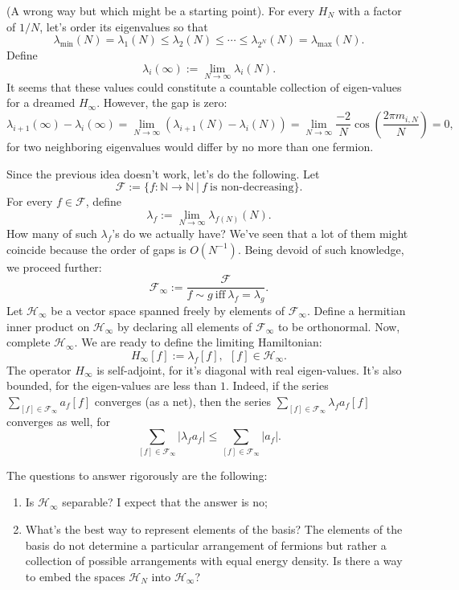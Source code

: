 \begin{idea}
(A wrong way but which might be a starting point). For every $H_N$ with a factor of $1/N$, let's order its eigenvalues so that
\[
\lambda_{\min}(N) = \lambda_1(N) \leq \lambda_2(N) \leq \cdots \leq \lambda_{2^N}(N) = \lambda_{\max}(N).
\]
Define
\[
\lambda_{i}(\infty) := \lim_{N \rightarrow \infty}\lambda_i(N).
\]
It seems that these values could constitute a countable collection of eigen-values for a dreamed $H_{\infty}$. However, the gap is zero:
\[
\lambda_{i+1}(\infty) - \lambda_{i}(\infty) = \lim_{N \rightarrow \infty}(\lambda_{i+1}(N) - \lambda_{i}(N)) = \lim_{N\rightarrow \infty} \frac{-2}{N}\cos(\frac{2\pi m_{i,N}}{N}) = 0,
\]
for two neighboring eigenvalues would differ by no more than one fermion.
\end{idea}
\begin{idea}
Since the previous idea doesn't work, let's do the following. Let
\[
\mathcal F := \{f : \mathbb N \rightarrow \mathbb N \ | \ f \ \text{is non-decreasing} \}.
\]
For every $f \in \mathcal F$, define
\[
\lambda_f := \lim_{N \rightarrow \infty} \lambda_{f(N)}(N).
\]
How many of such $\lambda_f$'s do we actually have? We've seen that a lot of them might coincide because the order of gaps is $O(N^{-1})$. Being devoid of such knowledge, we proceed further:
\[
\mathcal F_{\infty} := \frac{\mathcal F}{f \sim g \ \text{iff} \ \lambda_f = \lambda_g}.
\]
Let $\mathcal H_{\infty}$ be a vector space spanned freely by elements of $\mathcal F_{\infty}$. Define a hermitian inner product on $\mathcal H_{\infty}$ by declaring all elements of $\mathcal F_{\infty}$ to be orthonormal. Now, complete $\mathcal H_{\infty}$. We are ready to define the limiting Hamiltonian:
\[
H_{\infty} [f] := \lambda_f [f], \ \ [f] \in \mathcal H_{\infty}.
\]
The operator $H_{\infty}$ is self-adjoint, for it's diagonal with real eigen-values. It's also bounded, for the eigen-values are less than $1$. Indeed, if the series $\sum_{[f] \in \mathcal F_{\infty}} a_{f} [f]$ converges (as a net), then the series $\sum_{[f] \in \mathcal F_{\infty}} \lambda_fa_{f} [f]$ converges as well, for 
\[
\sum_{[f] \in \mathcal F_{\infty}} |\lambda_fa_{f}| \leq \sum_{[f] \in \mathcal F_{\infty}} |a_{f}|.
\]

The questions to answer rigorously are the following:
\begin{enumerate}
\item Is $\mathcal{H}_{\infty}$ separable? I expect that the answer is no;
\item What's the best way to represent elements of the basis? The elements of the basis do not determine a particular arrangement of fermions but rather a collection of possible arrangements with equal energy density. Is there a way to embed the spaces $\mathcal H_{N}$ into $\mathcal H_{\infty}$?
\end{enumerate}
\end{idea}


